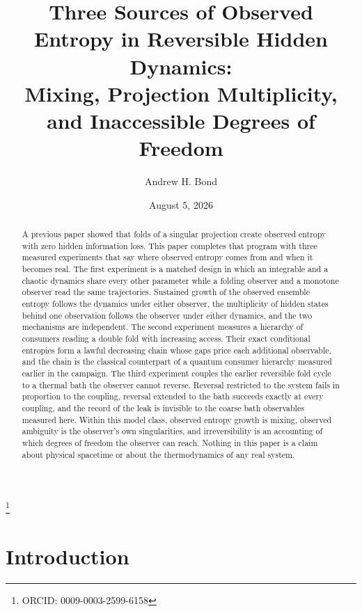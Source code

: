 \documentclass[aps,pre,reprint,nofootinbib]{revtex4-2}
\begin{document}
\title{Three Sources of Observed Entropy in Reversible Hidden Dynamics:\\
Mixing, Projection Multiplicity, and Inaccessible Degrees of Freedom}

\author{Andrew H. Bond}
\thanks{ORCID: 0009-0003-2599-6158}
\date{August 5, 2026}

\begin{abstract}
A previous paper showed that folds of a singular projection create observed
entropy with zero hidden information loss.  This paper completes that
program with three measured experiments that say where observed entropy
comes from and when it becomes real.  The first experiment is a matched
design in which an integrable and a chaotic dynamics share every other
parameter while a folding observer and a monotone observer read the same
trajectories.  Sustained growth of the observed ensemble entropy follows
the dynamics under either observer, the multiplicity of hidden states
behind one observation follows the observer under either dynamics, and the
two mechanisms are independent.  The second experiment measures a hierarchy
of consumers reading a double fold with increasing access.  Their exact
conditional entropies form a lawful decreasing chain whose gaps price each
additional observable, and the chain is the classical counterpart of a
quantum consumer hierarchy measured earlier in the campaign.  The third
experiment couples the earlier reversible fold cycle to a thermal bath the
observer cannot reverse.  Reversal restricted to the system fails in
proportion to the coupling, reversal extended to the bath succeeds exactly
at every coupling, and the record of the leak is invisible to the coarse
bath observables measured here.  Within this model class, observed entropy
growth is mixing, observed ambiguity is the observer's own singularities,
and irreversibility is an accounting of which degrees of freedom the
observer can reach.  Nothing in this paper is a claim about physical
spacetime or about the thermodynamics of any real system.
\end{abstract}

\maketitle

\section{Introduction}
\label{sec:intro}
\end{document}
